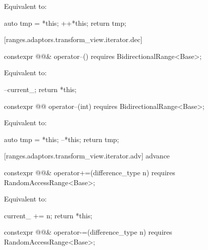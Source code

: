 \begin{itemdescr}
\pnum
\effects Equivalent to:
\begin{codeblock}
auto tmp = *this;
++*this;
return tmp;
\end{codeblock}
\end{itemdescr}

[ranges.adaptors.transform_view.iterator.dec]{}

\begin{itemdecl}
constexpr @@& operator--() requires BidirectionalRange<Base>;
\end{itemdecl}

\begin{itemdescr}
\pnum
\effects Equivalent to:
\begin{codeblock}
--current_;
return *this;
\end{codeblock}
\end{itemdescr}

\begin{itemdecl}
constexpr @@ operator--(int) requires BidirectionalRange<Base>;
\end{itemdecl}

\begin{itemdescr}
\pnum
\effects Equivalent to:
\begin{codeblock}
auto tmp = *this;
--*this;
return tmp;
\end{codeblock}
\end{itemdescr}

[ranges.adaptors.transform_view.iterator.adv]{ advance}

\begin{itemdecl}
constexpr @@& operator+=(difference_type n)
  requires RandomAccessRange<Base>;
\end{itemdecl}

\begin{itemdescr}
\pnum
\effects Equivalent to:
\begin{codeblock}
current_ += n;
return *this;
\end{codeblock}
\end{itemdescr}

%
\begin{itemdecl}
constexpr @@& operator-=(difference_type n)
  requires RandomAccessRange<Base>;
\end{itemdecl}

